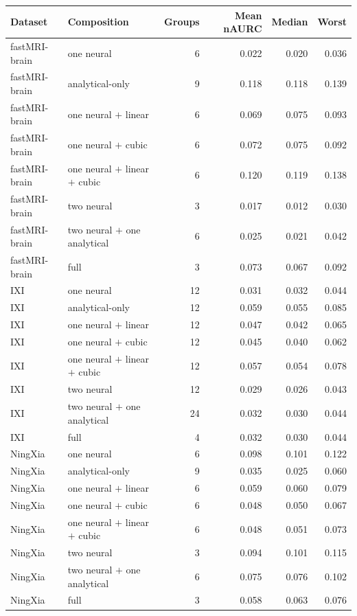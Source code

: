 \begin{tabular}{llrrrr}
\toprule
Dataset & Composition & Groups & Mean nAURC & Median & Worst \\
\midrule
fastMRI-brain & one neural & 6 & 0.022 & 0.020 & 0.036 \\
fastMRI-brain & analytical-only & 9 & 0.118 & 0.118 & 0.139 \\
fastMRI-brain & one neural $+$ linear & 6 & 0.069 & 0.075 & 0.093 \\
fastMRI-brain & one neural $+$ cubic & 6 & 0.072 & 0.075 & 0.092 \\
fastMRI-brain & one neural $+$ linear $+$ cubic & 6 & 0.120 & 0.119 & 0.138 \\
fastMRI-brain & two neural & 3 & 0.017 & 0.012 & 0.030 \\
fastMRI-brain & two neural $+$ one analytical & 6 & 0.025 & 0.021 & 0.042 \\
fastMRI-brain & full & 3 & 0.073 & 0.067 & 0.092 \\
\midrule
IXI & one neural & 12 & 0.031 & 0.032 & 0.044 \\
IXI & analytical-only & 12 & 0.059 & 0.055 & 0.085 \\
IXI & one neural $+$ linear & 12 & 0.047 & 0.042 & 0.065 \\
IXI & one neural $+$ cubic & 12 & 0.045 & 0.040 & 0.062 \\
IXI & one neural $+$ linear $+$ cubic & 12 & 0.057 & 0.054 & 0.078 \\
IXI & two neural & 12 & 0.029 & 0.026 & 0.043 \\
IXI & two neural $+$ one analytical & 24 & 0.032 & 0.030 & 0.044 \\
IXI & full & 4 & 0.032 & 0.030 & 0.044 \\
\midrule
NingXia & one neural & 6 & 0.098 & 0.101 & 0.122 \\
NingXia & analytical-only & 9 & 0.035 & 0.025 & 0.060 \\
NingXia & one neural $+$ linear & 6 & 0.059 & 0.060 & 0.079 \\
NingXia & one neural $+$ cubic & 6 & 0.048 & 0.050 & 0.067 \\
NingXia & one neural $+$ linear $+$ cubic & 6 & 0.048 & 0.051 & 0.073 \\
NingXia & two neural & 3 & 0.094 & 0.101 & 0.115 \\
NingXia & two neural $+$ one analytical & 6 & 0.075 & 0.076 & 0.102 \\
NingXia & full & 3 & 0.058 & 0.063 & 0.076 \\
\bottomrule
\end{tabular}
